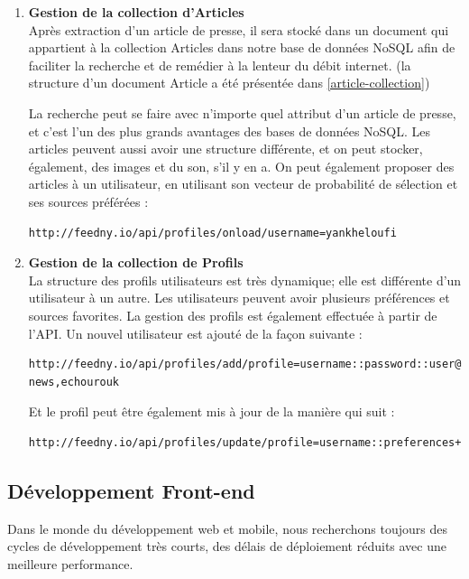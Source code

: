        \begin{enumerate}[leftmargin=*]
    \item\textbf{Gestion de la collection d'Articles}\\
    Après extraction d'un article de presse, il sera stocké dans un document qui appartient à la collection Articles dans notre base de données NoSQL afin de faciliter la recherche et de remédier à la lenteur du débit internet. (la structure d'un document Article a été présentée dans \autoref{article-collection})
    
    La recherche peut se faire avec n'importe quel attribut d'un article de presse, et c'est l'un des plus grands avantages des bases de données NoSQL. Les articles peuvent aussi avoir une structure différente, et on peut stocker, également, des images et du son, s'il y en a. On peut également proposer des articles à un utilisateur, en utilisant son vecteur de probabilité de sélection et ses sources préférées : 
    
\begin{lstlisting}[style=api] 
   http://feedny.io/api/profiles/onload/username=yankheloufi
\end{lstlisting} 

\item\textbf{Gestion de la collection de Profils}\\
La structure des profils utilisateurs est très dynamique; elle est différente d'un utilisateur à un autre. Les utilisateurs peuvent avoir plusieurs préférences et sources favorites. La gestion des profils est également effectuée à partir de l'API. 
Un nouvel utilisateur est ajouté de la façon suivante :   
\begin{lstlisting}[style=api] 
   http://feedny.io/api/profiles/add/profile=username::password::user@hey.com::sport,religion::bbc-news,echourouk
\end{lstlisting} 

Et le profil peut être également mis à jour de la manière qui suit : 
\begin{lstlisting}[style=api] 
   http://feedny.io/api/profiles/update/profile=username::preferences+algeria
\end{lstlisting}            
\end{enumerate} 

\subsection{Développement Front-end}
Dans le monde du développement web et mobile, nous recherchons toujours des cycles de développement très courts, des délais de déploiement réduits avec une meilleure performance. 

